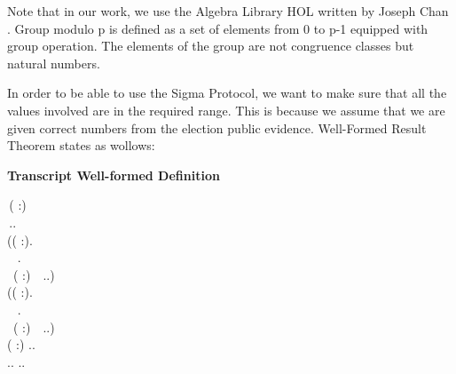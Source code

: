 Note that in our work, we use the Algebra Library HOL written by Joseph 
Chan \cite{Chan2018ClassificationOF}. Group modulo p is defined as a set of 
elements from 0 to p-1 equipped with group operation. 
The elements of the group are not congruence classes but natural numbers.

In order to be able to use the Sigma Protocol, we want to make sure that 
all the values involved are in the required range. This is because we assume 
that we are given correct numbers from the election public evidence.
Well-Formed Result Theorem states as wollows:
\newpage

\textbf{Transcript Well-formed Definition}
\begin{holmath}
    \,( :)\,\HOLSymConst{\HOLTokenEquiv{}}\\
\,..\,\HOLSymConst{\HOLTokenConj{}}\\
(\HOLSymConst{\HOLTokenForall{}}( :).\\
\,\,\,\,\,.\,\HOLSymConst{\HOLTokenImp{}}\\
\,\,\,( :)\,\HOLSymConst{\HOLTokenLt{}}\,\,\HOLSymConst{\HOLTokenConj{}}\,\,\HOLSymConst{\HOLTokenLt{}}\,..)\,\HOLSymConst{\HOLTokenConj{}}\\
(\HOLSymConst{\HOLTokenForall{}}( :).\\
\,\,\,\,\,.\,\HOLSymConst{\HOLTokenImp{}}\\
\,\,\,( :)\,\HOLSymConst{\HOLTokenLt{}}\,\,\HOLSymConst{\HOLTokenConj{}}\,\,\HOLSymConst{\HOLTokenLt{}}\,..)\,\HOLSymConst{\HOLTokenConj{}}\\
( :)\,\HOLSymConst{\HOLTokenLt{}}\,..\,\HOLSymConst{\HOLTokenConj{}}\\
..\,\HOLSymConst{\HOLTokenLt{}}\,..
\end{holmath}  

